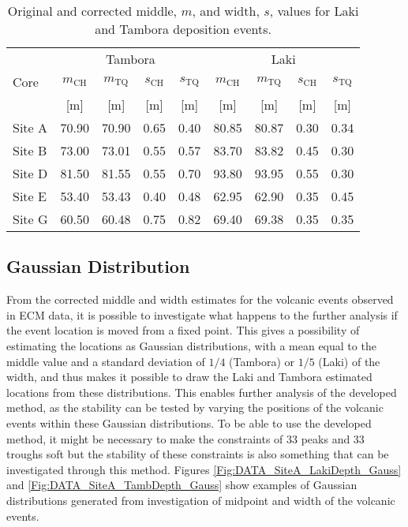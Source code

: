 \documentclass[../../CompleteThesis2/Complete_2ndDraft]{subfiles}
\begin{document}
\begin{table}[h]
	\centering
	\begin{tabular}{l|cc|cc|cc|cc|}
		& \multicolumn{4}{c|}{Tambora} & \multicolumn{4}{c|}{Laki}\\
		Core & $m_{\text{CH}}$ & $m_{\text{TQ}}$ & $s_{\text{CH}}$ & $s_{\text{TQ}}$& $m_{\text{CH}}$ & $m_{\text{TQ}}$ & $s_{\text{CH}}$ & $s_{\text{TQ}}$ \\
		 & [m] & [m] & [m] & [m]& [m] & [m] & [m] & [m] \\
		\hline
		Site A & 70.90 & 70.90 & 0.65 & 0.40 & 80.85 & 80.87 & 0.30 & 0.34 \\
		Site B & 73.00 & 73.01 & 0.55 & 0.57 & 83.70 & 83.82 & 0.45 & 0.30 \\	
		Site D & 81.50 & 81.55 & 0.55 & 0.70 & 93.80 & 93.95 & 0.55 & 0.30 \\
		Site E & 53.40 & 53.43 & 0.40 & 0.48 & 62.95 & 62.90 & 0.35 & 0.45 \\
		Site G & 60.50 & 60.48 & 0.75 & 0.82 & 69.40 & 69.38 & 0.35 & 0.35 \\
	\end{tabular}
	\caption[Corrected Laki and Tambora positions]{\footnotesize Original and corrected middle, $m$, and width, $s$, values for Laki and Tambora deposition events.}
	\label{Tab:LakiTamb_corr}
\end{table}



\subsection[Gaussian Distribution]{Gaussian Distribution}
\label{Subsec:Data_VolcanicHorizons_GaussDist}


From the corrected middle and width estimates for the volcanic events observed in ECM data, it is possible to investigate what happens to the further analysis if the event location is moved from a fixed point. This gives a possibility of estimating the locations as Gaussian distributions, with a mean equal to the middle value and a standard deviation of $1/4$ (Tambora) or $1/5$ (Laki) of the width, and thus makes it possible to draw the Laki and Tambora estimated locations from these distributions. This enables further analysis of the developed method, as the stability can be tested by varying the positions of the volcanic events within these Gaussian distributions. To be able to use the developed method, it might be necessary to make the constraints of 33 peaks and 33 troughs soft but the stability of these constraints is also something that can be investigated through this method. Figures \ref{Fig:DATA_SiteA_LakiDepth_Gauss} and \ref{Fig:DATA_SiteA_TambDepth_Gauss} show examples of Gaussian distributions generated from investigation of midpoint and width of the volcanic events. 
\end{document}
